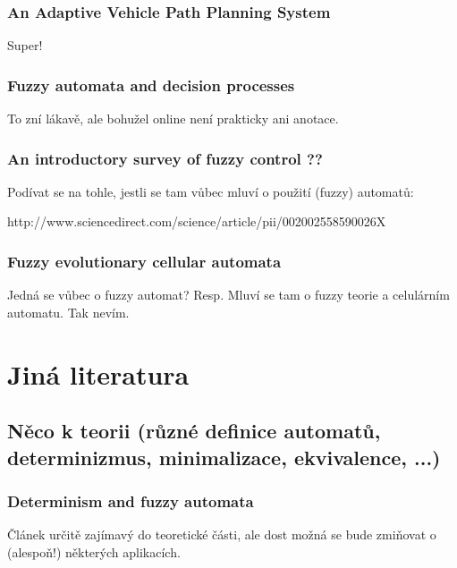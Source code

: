 \documentclass[a4paper,10pt]{article}
\begin{document}
\subsubsection*{An Adaptive Vehicle Path Planning System \cite{HuaHuWanCheTas-AdaVehPathPlanSys}}
Super!

\subsubsection*{Fuzzy automata and decision processes\cite{GupSar-FuzzAutDecProc}}

To zní lákavě, ale bohužel online není prakticky ani anotace.


\subsubsection*{An introductory survey of fuzzy control ??}

Podívat se na tohle, jestli se tam vůbec mluví o použití (fuzzy) automatů:

http://www.sciencedirect.com/science/article/pii/002002558590026X



\subsubsection*{Fuzzy evolutionary cellular automata \cite{Rich-FuzEvoCellAut}}
Jedná se vůbec o fuzzy automat? Resp. Mluví se tam o fuzzy teorie a celulárním automatu. Tak nevím.

\section{Jiná literatura}


\subsection{Něco k teorii (různé definice automatů, determinizmus, minimalizace, ekvivalence, ...)}

\subsubsection*{Determinism and fuzzy automata \cite{Bel-DetFuzzAut}}
Článek určitě zajímavý do teoretické části, ale dost možná se bude zmiňovat o (alespoň!) některých aplikacích.
\end{document}
